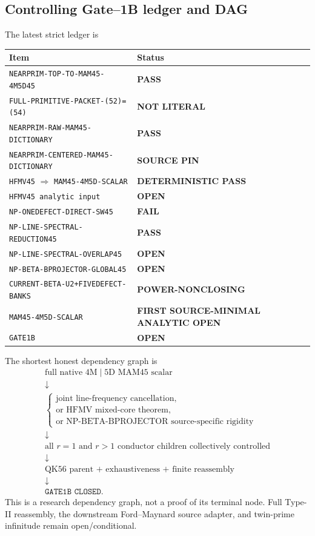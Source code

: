 \documentclass[11pt]{article}
\theoremstyle{definition}
\newcommand{\1}{\mathbf 1}
\begin{document}
\subsection{Controlling Gate--1B ledger and DAG}
The latest strict ledger is
\begin{center}
\small
\begin{tabular}{p{}p{}}
\toprule
Item & Status\\
\midrule
\texttt{NEARPRIM-TOP-TO-MAM45-4M5D45} & \textbf{PASS}\\
\texttt{FULL-PRIMITIVE-PACKET-(52)=(54)} & \textbf{NOT LITERAL}\\
\texttt{NEARPRIM-RAW-MAM45-DICTIONARY} & \textbf{PASS}\\
\texttt{NEARPRIM-CENTERED-MAM45-DICTIONARY} & \textbf{SOURCE PIN}\\
\texttt{HFMV45} $\Rightarrow$ \texttt{MAM45-4M5D-SCALAR} & \textbf{DETERMINISTIC PASS}\\
\texttt{HFMV45 analytic input} & \textbf{OPEN}\\
\texttt{NP-ONEDEFECT-DIRECT-SW45} & \textbf{FAIL}\\
\texttt{NP-LINE-SPECTRAL-REDUCTION45} & \textbf{PASS}\\
\texttt{NP-LINE-SPECTRAL-OVERLAP45} & \textbf{OPEN}\\
\texttt{NP-BETA-BPROJECTOR-GLOBAL45} & \textbf{OPEN}\\
\texttt{CURRENT-BETA-U2+FIVEDEFECT-BANKS} & \textbf{POWER-NONCLOSING}\\
\texttt{MAM45-4M5D-SCALAR} & \textbf{FIRST SOURCE-MINIMAL ANALYTIC OPEN}\\
\texttt{GATE1B} & \textbf{OPEN}\\
\bottomrule
\end{tabular}
\end{center}
The shortest honest dependency graph is
\[
\boxed{
\begin{array}{c}
\text{full native }4\text{M}\mid5\text{D MAM45 scalar}\\
\downarrow\\
\begin{cases}
\text{joint line-frequency cancellation},\\
\text{or HFMV mixed-core theorem},\\
\text{or NP-BETA-BPROJECTOR source-specific rigidity}
\end{cases}\\
\downarrow\\
\text{all }r=1\text{ and }r>1\text{ conductor children collectively controlled}\\
\downarrow\\
\text{QK56 parent + exhaustiveness + finite reassembly}\\
\downarrow\\
\texttt{GATE1B CLOSED}.
\end{array}}
\]
This is a research dependency graph, not a proof of its terminal node.  Full
Type-II reassembly, the downstream Ford--Maynard source adapter, and twin-prime
infinitude remain open/conditional.
\end{document}
